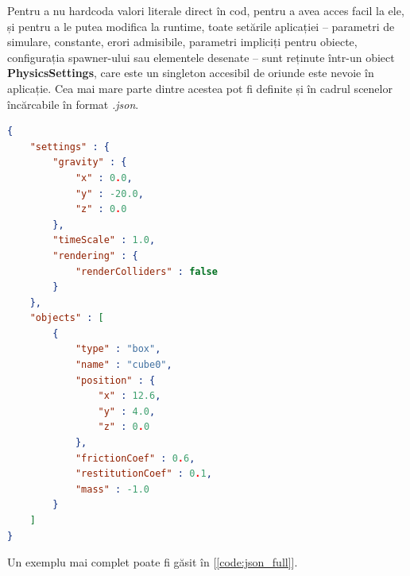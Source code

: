 \documentclass[12pt,a4paper]{report}
\begin{document}
Pentru a nu hardcoda valori literale direct în cod, pentru a avea acces facil la ele, și pentru a le putea modifica la runtime, toate setările aplicației -- parametri de simulare, constante, erori admisibile, parametri impliciți pentru obiecte, configurația spawner-ului sau elementele desenate -- sunt reținute într-un obiect \textbf{PhysicsSettings}, care este un singleton accesibil de oriunde este nevoie în aplicație. Cea mai mare parte dintre acestea pot fi definite și în cadrul scenelor încărcabile în format \textit{.json}.

\begin{lstlisting}[language=json, label={code:json_example}, caption={Exemplu de scenă în format .json}]
{
	"settings" : {
		"gravity" : {
			"x" : 0.0,
			"y" : -20.0,
			"z" : 0.0
		},
		"timeScale" : 1.0,
		"rendering" : {
			"renderColliders" : false
		}
	},
	"objects" : [
		{
			"type" : "box",
			"name" : "cube0",
			"position" : {
				"x" : 12.6,
				"y" : 4.0,
				"z" : 0.0
			},
			"frictionCoef" : 0.6,
			"restitutionCoef" : 0.1,
			"mass" : -1.0
		}
	]
}
\end{lstlisting}
Un exemplu mai complet poate fi găsit în [\autoref{code:json_full}].
%
%
%
\end{document}
